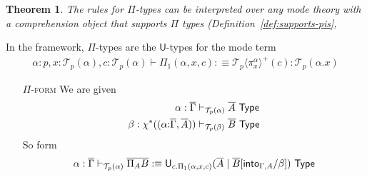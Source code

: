 \documentclass[10pt]{article}
\newtheorem{theorem}{Theorem}
\theoremstyle{definition}
\newcommand{\yields}{\vdash}
\newcommand{\TYPE}{\,\,\mathsf{Type}}
\newcommand{\telety}[3]{\ensuremath{(#1{:}#2,#3)}}
\newcommand\U[3]{\ensuremath{\mathsf{U}_{#1}(#2 \mid #3)}}
\newcommand\St[2]{\ensuremath{{#1}^*(#2)}}
\newcommand\TrPlus[2]{\ensuremath{{#1}^+(#2)}}
\newcommand\El[2]{\mathcal{T}_{#1}(#2)}
\newcommand\ApEl[2]{\mathcal{T}_{#1}\langle#2\rangle}
\begin{document}
\begin{theorem}
The rules for $\Pi$-types can be interpreted over any mode theory with a comprehension object that supports $\Pi$ types (Definition~\ref{def:supports-pis}, 
\end{theorem}

In the framework, $\Pi$-types are the $\mathsf{U}$-types for the mode term
\begin{align*}
\alpha : p, x : \El{p}{\alpha}, c : \El{p}{\alpha} \yields \Pi_1(\alpha,x,c) :\equiv \TrPlus{\ApEl{p}{\pi^\alpha_x}}{c} : \El{p}{\alpha.x}
\end{align*}

\begin{enumerate}
\item[\textsc{$\Pi$-form}] We are given
\begin{align*}
\alpha : \upstairs{\Gamma} &\yields_{\El{p}{\alpha}} \upstairs{A} \TYPE \\
\beta : \St{\chi}{\telety{\alpha}{\upstairs{\Gamma}}{\upstairs{A}}} &\yields_{\El{p}{\beta}} \upstairs{B} \TYPE
\end{align*}
So form
\begin{align*}
\alpha : \upstairs{\Gamma} \yields_{\El{p}{\alpha}} \upstairs{\Pi_A B} :\equiv \U{c. \Pi_1(\alpha,x,c)}{\upstairs{A}}{\upstairs{B}[\into{\Gamma, A}/\beta]} \TYPE
\end{align*}


\end{enumerate}
\end{document}
